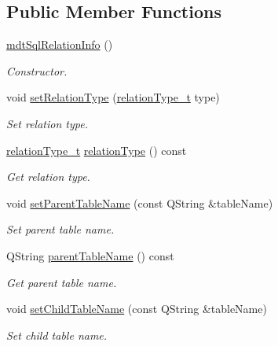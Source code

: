 \subsection*{Public Member Functions}
\begin{DoxyCompactItemize}
\item 
\hyperlink{classmdt_sql_relation_info_a9c3ae415ee5382a78d28aaf67d625249}{mdt\-Sql\-Relation\-Info} ()
\begin{DoxyCompactList}\small\item\em Constructor. \end{DoxyCompactList}\item 
void \hyperlink{classmdt_sql_relation_info_a31c364e3a994f99f2f817b6e824fb723}{set\-Relation\-Type} (\hyperlink{classmdt_sql_relation_info_af36930de03b1cb16976f35987df2029e}{relation\-Type\-\_\-t} type)
\begin{DoxyCompactList}\small\item\em Set relation type. \end{DoxyCompactList}\item 
\hyperlink{classmdt_sql_relation_info_af36930de03b1cb16976f35987df2029e}{relation\-Type\-\_\-t} \hyperlink{classmdt_sql_relation_info_a72319220049c3c0c8623f0512b1740ae}{relation\-Type} () const 
\begin{DoxyCompactList}\small\item\em Get relation type. \end{DoxyCompactList}\item 
void \hyperlink{classmdt_sql_relation_info_a604239ad101c1f8f48e9deb10dbc386d}{set\-Parent\-Table\-Name} (const Q\-String \&table\-Name)
\begin{DoxyCompactList}\small\item\em Set parent table name. \end{DoxyCompactList}\item 
Q\-String \hyperlink{classmdt_sql_relation_info_a335960a14e3d165fd190703a87389184}{parent\-Table\-Name} () const 
\begin{DoxyCompactList}\small\item\em Get parent table name. \end{DoxyCompactList}\item 
void \hyperlink{classmdt_sql_relation_info_a41097c0e1ecedfacfb1ac0e4055bc006}{set\-Child\-Table\-Name} (const Q\-String \&table\-Name)
\begin{DoxyCompactList}\small\item\em Set child table name. \end{DoxyCompactList}\item 

\end{DoxyCompactItemize}
